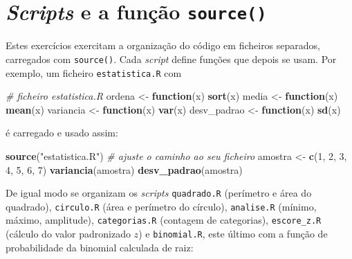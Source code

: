 \documentclass[
  portuguese,
  11pt,
  openany]{book}
\newenvironment{Shaded}{\begin{snugshade}}{\end{snugshade}}
\newcommand{\CommentTok}[1]{\textcolor[rgb]{0.56,0.35,0.01}{\textit{#1}}}
\newcommand{\ControlFlowTok}[1]{\textcolor[rgb]{0.13,0.29,0.53}{\textbf{#1}}}
\newcommand{\DecValTok}[1]{\textcolor[rgb]{0.00,0.00,0.81}{#1}}
\newcommand{\FunctionTok}[1]{\textcolor[rgb]{0.13,0.29,0.53}{\textbf{#1}}}
\newcommand{\NormalTok}[1]{#1}
\newcommand{\OtherTok}[1]{\textcolor[rgb]{0.56,0.35,0.01}{#1}}
\newcommand{\StringTok}[1]{\textcolor[rgb]{0.31,0.60,0.02}{#1}}
\begin{document}
\section{\texorpdfstring{\emph{Scripts} e a função \texttt{source()}}{Scripts e a função source()}}\label{scripts-e-a-funuxe7uxe3o-source}

Estes exercícios exercitam a organização do código em ficheiros separados,
carregados com \texttt{source()}. Cada \emph{script} define funções que depois se usam. Por
exemplo, um ficheiro \texttt{estatistica.R} com

\begin{Shaded}
\begin{Highlighting}[]
\CommentTok{\# ficheiro estatistica.R}
\NormalTok{ordena     }\OtherTok{\textless{}{-}} \ControlFlowTok{function}\NormalTok{(x) }\FunctionTok{sort}\NormalTok{(x)}
\NormalTok{media      }\OtherTok{\textless{}{-}} \ControlFlowTok{function}\NormalTok{(x) }\FunctionTok{mean}\NormalTok{(x)}
\NormalTok{variancia  }\OtherTok{\textless{}{-}} \ControlFlowTok{function}\NormalTok{(x) }\FunctionTok{var}\NormalTok{(x)}
\NormalTok{desv\_padrao }\OtherTok{\textless{}{-}} \ControlFlowTok{function}\NormalTok{(x) }\FunctionTok{sd}\NormalTok{(x)}
\end{Highlighting}
\end{Shaded}

é carregado e usado assim:

\begin{Shaded}
\begin{Highlighting}[]
\FunctionTok{source}\NormalTok{(}\StringTok{"estatistica.R"}\NormalTok{)            }\CommentTok{\# ajuste o caminho ao seu ficheiro}
\NormalTok{amostra }\OtherTok{\textless{}{-}} \FunctionTok{c}\NormalTok{(}\DecValTok{1}\NormalTok{, }\DecValTok{2}\NormalTok{, }\DecValTok{3}\NormalTok{, }\DecValTok{4}\NormalTok{, }\DecValTok{5}\NormalTok{, }\DecValTok{6}\NormalTok{, }\DecValTok{7}\NormalTok{)}
\FunctionTok{variancia}\NormalTok{(amostra)}
\FunctionTok{desv\_padrao}\NormalTok{(amostra)}
\end{Highlighting}
\end{Shaded}

De igual modo se organizam os \emph{scripts} \texttt{quadrado.R} (perímetro e área do
quadrado), \texttt{circulo.R} (área e perímetro do círculo), \texttt{analise.R} (mínimo,
máximo, amplitude), \texttt{categorias.R} (contagem de categorias), \texttt{escore\_z.R}
(cálculo do valor padronizado \(z\)) e \texttt{binomial.R}, este último com a função de
probabilidade da binomial calculada de raiz:
\end{document}

